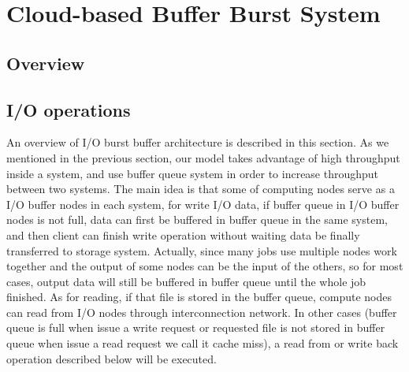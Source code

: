 \section{Cloud-based Buffer Burst System}
\label{sec:architecture}
\subsection{Overview}
\subsection{I/O operations}

An overview of I/O burst buffer architecture is described in this section.
As we mentioned in the previous section, our model takes advantage of high
throughput inside a system, and use buffer queue system in order to increase throughput between two systems.
The main idea is that some of computing nodes serve as a I/O buffer nodes in each system, for write I/O data, if buffer queue in I/O buffer nodes is not full, data can first be buffered in buffer queue in the same system, and then client can finish write operation without waiting data be finally transferred to storage system.
Actually, since many jobs use multiple nodes work together and the output of some nodes can be the
input of the others, so for most cases, output data will still be buffered in buffer queue until the whole job finished.
As for reading, if that file is stored in the buffer queue, compute nodes can read from I/O nodes through interconnection network.
In other cases (buffer queue is full when issue a write request or requested file is not stored in buffer queue when issue a read request we call it cache miss), a read from or write back operation described below will be executed. 


